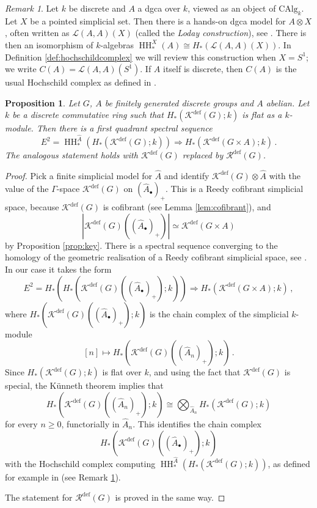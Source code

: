 \documentclass[oneside, a4paper, 12pt]{article}
\numberwithin{equation}{section}
\DeclareMathOperator{\HH}{HH}
\newcommand{\Kdef}{\mathcal{K}^{\mathrm{def}}}
\newcommand{\Rdef}{\mathcal{R}^{\mathrm{def}}}
\newcommand{\CAlg}{\mathrm{CAlg}}
\theoremstyle{plain}
\newtheorem{proposition}[theorem]{Proposition}
\theoremstyle{definition}
\theoremstyle{remark}
\newtheorem{remark}[theorem]{Remark}
\begin{document}
\begin{remark}  \label{rem:hochschild}
Let $k$ be discrete and $A$ a dgca over $k$, viewed as an object of $\CAlg_k$. Let $X$ be a pointed simplicial set. Then there is a hands-on dgca model for $A\otimes X$, often written as $\mathcal{L}(A,A)(X)$ (called the \emph{Loday construction}), see \cite[Section 5.1]{Pirashvili}. There is then an isomorphism of $k$-algebras $\HH^X_\ast(A)\cong H_\ast(\mathcal{L}(A,A)(X))$. In Definition \ref{def:hochschildcomplex} we will review this construction when $X=S^1$; we write $C(A)=\mathcal{L}(A,A)(S^1)$. If $A$ itself is discrete, then $C(A)$ is the usual Hochschild complex as defined in \cite[Section 1.1.3]{Loday}.
\end{remark}




\begin{proposition} \label{prop:ss}
Let $G$, $A$ be finitely generated discrete groups and $A$ abelian. Let $k$ be a discrete commutative ring such that $H_\ast(\Kdef(G);k)$ is flat as a $k$-module. Then there is a first quadrant spectral sequence
\[
E^2=\HH^{\widehat{A}}_\ast(H_\ast(\Kdef(G);k)) \Longrightarrow  H_\ast(\Kdef(G\times A);k)\, .
\]
The analogous statement holds with $\Kdef(G)$ replaced by $\Rdef(G)$.
\end{proposition}
\begin{proof}
Pick a finite simplicial model for $\widehat{A}$ and identify $\Kdef(G) \otimes \widehat{A}$ with the value of the $\Gamma$-space $\Kdef(G)$ on $(\widehat{A}_\bullet)_+$. This is a Reedy cofibrant simplicial space, because $\Kdef(G)$ is cofibrant (see Lemma \ref{lem:cofibrant}), and
\[
|\Kdef(G)((\widehat{A}_\bullet)_+)|\simeq \Kdef(G\times A)
\]
by Proposition \ref{prop:key}. There is a spectral sequence converging to the homology of the geometric realisation of a Reedy cofibrant simplicial space, see \cite[Theorem 11.14]{Mayiteratedloopspaces}. In our case it takes the form
\[
E^2=H_\ast(H_\ast(\Kdef(G)((\widehat{A}_\bullet)_+);k)) \Longrightarrow H_\ast(\Kdef(G\times A);k)\, ,
\]
where $H_\ast(\Kdef(G)((\widehat{A}_\bullet)_+);k)$ is the chain complex of the simplicial $k$-module
\[
[n]\mapsto H_\ast(\Kdef(G)((\widehat{A}_n)_+);k)\,.
\]
Since $H_\ast(\Kdef(G);k)$ is flat over $k$, and using the fact that $\Kdef(G)$ is special, the K{\"u}nneth theorem implies that 
\[
H_\ast(\Kdef(G)((\widehat{A}_n)_+);k)\cong \bigotimes_{\widehat{A}_n} H_\ast(\Kdef(G);k)
\]
for every $n\geq 0$, functorially in $\widehat{A}_n$. This identifies the chain complex
\[
H_\ast(\Kdef(G)((\widehat{A}_\bullet)_+);k) 
\]
with the Hochschild complex computing $\HH^{\widehat{A}}_\ast(H_\ast(\Kdef(G);k))$, as defined for example in \cite[Section 5.1]{Pirashvili} (see Remark \ref{rem:hochschild}).

The statement for $\Rdef(G)$ is proved in the same way.
\end{proof}
\end{document}
